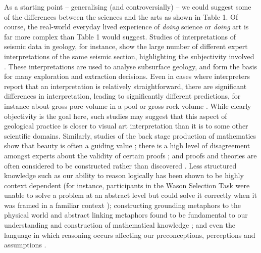 \documentclass[letterpaper]{article}
\begin{document}
As a starting point -- generalising (and controversially) -- we could
suggest some of the differences between the sciences and the arts as
shown in Table 1. Of course, the real-world everyday lived experience
of {\em doing} science or {\em doing} art is far more complex than
Table 1 would suggest. Studies of interpretations of seismic data in
geology, for instance, show the large number of different expert
interpretations of the same seismic section, highlighting the
subjectivity involved \cite{bond}. These interpretations are used to
analyse subsurface geology, and form the basis for many exploration
and extraction decisions. Even in cases where interpreters report that
an interpretation is relatively straightforward, there are significant
differences in interpretation, leading to significantly different
predictions, for instance about gross pore volume in a pool or gross
rock volume \cite{rankey}. While clearly objectivity is the goal here,
such studies may suggest that this aspect of geological practice is
closer to visual art interpretation than it is to some other
scientific domains. Similarly, studies of the back stage production of
mathematics show that beauty is often a guiding value
\cite{inglis:15}; there is a high level of disagreement amongst
experts about the validity of certain proofs \cite{inglis}; and proofs
and theories are often considered to be constructed rather than
discovered \cite{lakatos}. Less structured knowledge such as our
ability to reason logically has been shown to be highly context
dependent (for instance, participants in the Wason Selection Task were
unable to solve a problem at an abstract level but could solve it
correctly when it was framed in a familiar context \cite{wason});
constructing grounding metaphors to the physical world and abstract
linking metaphors found to be fundamental to our understanding and
construction of mathematical knowledge \cite{Lak00}; and even the
language in which reasoning occurs affecting our preconceptions,
perceptions and assumptions \cite{dehaene,barton}.
\end{document}
